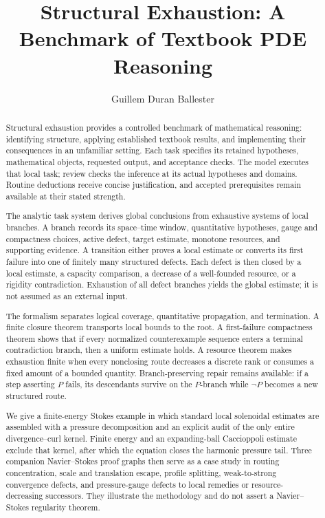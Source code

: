 \documentclass[11pt,reqno]{amsart}
\title[Structural Reasoning Benchmarks for PDE]
{Structural Exhaustion: A Benchmark of Textbook PDE Reasoning}
\author{Guillem Duran Ballester}
\date{}
\theoremstyle{plain}
\theoremstyle{definition}
\theoremstyle{remark}
\numberwithin{equation}{section}
\begin{document}
\raggedbottom

\begin{abstract}
Structural exhaustion provides a controlled benchmark of mathematical
reasoning: identifying structure, applying established textbook results, and
implementing their consequences in an unfamiliar setting. Each task specifies
its retained hypotheses, mathematical objects, requested output, and acceptance
checks. The model executes that local task; review checks the inference at its
actual hypotheses and domains. Routine deductions receive concise justification,
and accepted prerequisites remain available at their stated strength.

The analytic task system derives global conclusions from exhaustive systems
of local branches.  A
branch records its space--time window, quantitative hypotheses, gauge and
compactness choices, active defect, target estimate, monotone resources, and
supporting evidence.  A transition either proves a local estimate or converts
its first failure into one of finitely many structured defects.  Each defect is
then closed by a local estimate, a capacity comparison, a decrease of a
well-founded resource, or a rigidity contradiction.  Exhaustion of all defect
branches yields the global estimate; it is not assumed as an external input.

The formalism separates logical coverage, quantitative propagation, and
termination.  A finite closure theorem transports local bounds to the root.  A
first-failure compactness theorem shows that if every normalized counterexample
sequence enters a terminal contradiction branch, then a uniform estimate
holds.  A resource theorem makes exhaustion finite when every nonclosing route
decreases a discrete rank or consumes a fixed amount of a bounded quantity.
Branch-preserving repair remains available: if a step asserting \(P\) fails,
its descendants survive on the \(P\)-branch while \(\neg P\) becomes a new
structured route.

We give a finite-energy Stokes example in which standard local solenoidal
estimates are assembled with a pressure decomposition and an explicit audit of
the only entire divergence--curl kernel.  Finite energy and an expanding-ball
Caccioppoli estimate exclude that kernel, after which the equation closes the
harmonic pressure tail.  Three companion Navier--Stokes proof graphs then serve as a
case study in routing concentration, scale and translation escape, profile
splitting, weak-to-strong convergence defects, and pressure-gauge defects to
local remedies or resource-decreasing successors.  They illustrate the
methodology and do not assert a Navier--Stokes regularity theorem.
\end{abstract}
\end{document}
